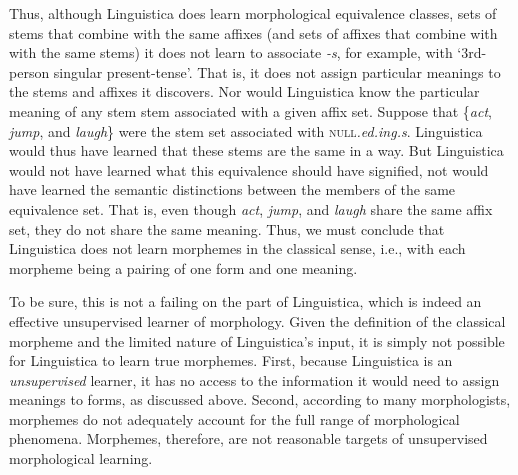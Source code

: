 Thus, although Linguistica does learn morphological equivalence classes, 
sets of stems that combine with the same affixes (and sets of affixes that combine with with the same stems) %
it does not learn to associate \textit{-s}, for example, 
with `3rd-person singular present-tense'. That is, it does not assign particular
meanings to the stems and affixes it discovers.
Nor would Linguistica know 
the particular meaning of any stem stem associated with
a given affix set. 
Suppose that \{\textit{act}, \emph{jump}, and \emph{laugh}\} were the 
stem set associated with
\textsc{null}\textit{.ed.ing.s}. Linguistica would thus have learned that these
stems are the same in a way.
But Linguistica would not have 
learned what this equivalence should have signified, not would have 
learned the semantic 
distinctions between the members of the same equivalence set. That is, 
even though \textit{act}, \emph{jump}, and \emph{laugh} share the same
affix set, they do not share the same meaning. Thus, we must conclude that 
Linguistica does not learn morphemes in the classical sense, i.e., 
with each morpheme being a
pairing of one form and one meaning.

To be sure, this is not a failing on the 
part of Linguistica, which is indeed an effective 
unsupervised learner of morphology. Given the definition 
of the classical morpheme and the 
limited nature of Linguistica's input, it is simply not possible for 
Linguistica to learn true morphemes. First, because Linguistica 
is an \emph{unsupervised} learner, it has no access to the information it would 
need to assign meanings to forms, as discussed above. Second, according to 
many morphologists, morphemes do not adequately 
account for the full range of morphological
phenomena. Morphemes, therefore, are not reasonable targets of unsupervised morphological learning.


